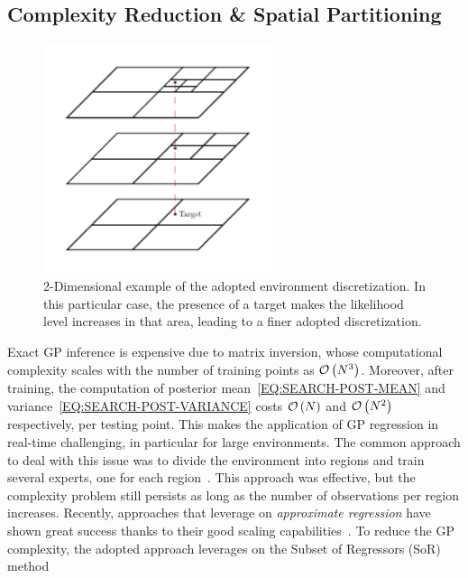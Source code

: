 \subsection{Complexity Reduction \& Spatial Partitioning}%
\label{SEC:SEARCH-COMPLEXITY-REDUCTION}
\begin{figure}[!t]
	\centering
	\includegraphics[width=0.6\textwidth]{Figs/Chapter4/map_discretization.pdf}
	\caption{2-Dimensional example of the adopted environment discretization.
			 In this particular case, the presence of a target makes the likelihood level increases in that area, leading to a
			 finer adopted discretization.}
	\label{FIG:SEARCH-SPACE-DISCRETIZATION}
\end{figure}
Exact GP inference is expensive due to matrix inversion, whose computational complexity scales with the number of training points as
$\mathcal{O} \left( N^3 \right)$. Moreover, after training, the computation of posterior mean~\eqref{EQ:SEARCH-POST-MEAN} and
variance~\eqref{EQ:SEARCH-POST-VARIANCE} costs $\mathcal{O}\left( N \right)$ and $\mathcal{O} \left( N^2 \right)$ respectively,
per testing point. This makes the application of GP regression in real-time challenging, in particular for large environments.
The common approach to deal with this issue was to divide the environment into regions and train several experts, one for each
region~\cite{kim2013continuous}. This approach was effective, but the complexity problem still persists as long as the number of
observations per region increases. Recently, approaches that leverage on \textit{approximate regression} have shown great success
thanks to their good scaling capabilities~\cite{quinonero2005unifying, wilson2015kernel, gardner2018product}.
To reduce the GP complexity, the adopted approach leverages on the Subset of Regressors (SoR) method~\cite{quinonero2005unifying}
